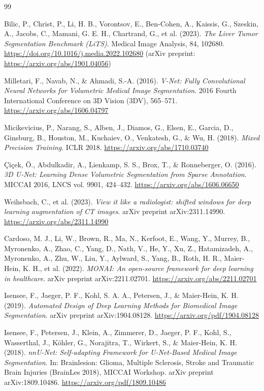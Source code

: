 \documentclass[12pt, a4paper]{report}
\begin{document}
\begin{thebibliography}{99}


Bilic, P., Christ, P., Li, H. B., Vorontsov, E., Ben-Cohen, A., Kaissis, G.,
Szeskin, A., Jacobs, C., Mamani, G. E. H., Chartrand, G., et al. (2023).
\textit{The Liver Tumor Segmentation Benchmark (LiTS)}.
Medical Image Analysis, 84, 102680.
\url{https://doi.org/10.1016/j.media.2022.102680}
(arXiv preprint: \url{https://arxiv.org/abs/1901.04056})

Milletari, F., Navab, N., \& Ahmadi, S.-A. (2016).
\textit{V-Net: Fully Convolutional Neural Networks for Volumetric Medical
Image Segmentation}.
2016 Fourth International Conference on 3D Vision (3DV), 565--571.
\url{https://arxiv.org/abs/1606.04797}

Micikevicius, P., Narang, S., Alben, J., Diamos, G., Elsen, E., Garcia, D.,
Ginsburg, B., Houston, M., Kuchaiev, O., Venkatesh, G., \& Wu, H. (2018).
\textit{Mixed Precision Training}.
ICLR 2018.
\url{https://arxiv.org/abs/1710.03740}

Çiçek, Ö., Abdulkadir, A., Lienkamp, S. S., Brox, T., \& Ronneberger, O. (2016).
\textit{3D U-Net: Learning Dense Volumetric Segmentation from Sparse Annotation}.
MICCAI 2016, LNCS vol. 9901, 424--432.
\url{https://arxiv.org/abs/1606.06650}

Weihsbach, C., et al. (2023).
\textit{View it like a radiologist: shifted windows for deep learning
augmentation of CT images}.
arXiv preprint arXiv:2311.14990.
\url{https://arxiv.org/abs/2311.14990}

Cardoso, M. J., Li, W., Brown, R., Ma, N., Kerfoot, E., Wang, Y., Murrey, B.,
Myronenko, A., Zhao, C., Yang, D., Nath, V., He, Y., Xu, Z., Hatamizadeh, A.,
Myronenko, A., Zhu, W., Liu, Y., Aylward, S., Yang, B., Roth, H. R., Maier-Hein, K. H.,
et al. (2022).
\textit{MONAI: An open-source framework for deep learning in healthcare}.
arXiv preprint arXiv:2211.02701.
\url{https://arxiv.org/abs/2211.02701}

Isensee, F., Jaeger, P. F., Kohl, S. A. A., Petersen, J., \& Maier-Hein, K. H. (2019).
\textit{Automated Design of Deep Learning Methods for Biomedical Image Segmentation}.
arXiv preprint arXiv:1904.08128.
\url{https://arxiv.org/pdf/1904.08128}

Isensee, F., Petersen, J., Klein, A., Zimmerer, D., Jaeger, P. F., Kohl, S.,
Wasserthal, J., Köhler, G., Norajitra, T., Wirkert, S., \& Maier-Hein, K. H. (2018).
\textit{nnU-Net: Self-adapting Framework for U-Net-Based Medical Image Segmentation}.
In: Brainlesion: Glioma, Multiple Sclerosis, Stroke and Traumatic Brain Injuries (BrainLes 2018), MICCAI Workshop.
arXiv preprint arXiv:1809.10486.
\url{https://arxiv.org/pdf/1809.10486}


\end{thebibliography}
\end{document}
